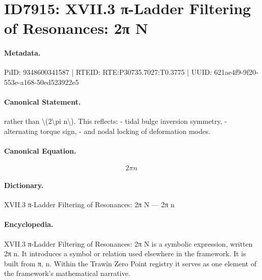 \section*{ID7915: XVII.3 π-Ladder Filtering of Resonances: 2π N}
\paragraph{Metadata.}
PiID: 9348600341587 | RTEID: RTE:P30735.7027:T0.3775 | UUID: 621ae4f9-9f20-553e-a168-50ed523922e5

\paragraph{Canonical Statement.}
rather than \textbackslash{}(2\textbackslash{}pi n\textbackslash{}). This reflects: - tidal bulge inversion symmetry, - alternating torque sign, - and nodal locking of deformation modes.

\paragraph{Canonical Equation.}
\[
2\pi n
\]

\paragraph{Dictionary.}
XVII.3 π-Ladder Filtering of Resonances: 2π N — 2π n

\paragraph{Encyclopedia.}
XVII.3 π-Ladder Filtering of Resonances: 2π N is a symbolic expression, written 2π n. It introduces a symbol or relation used elsewhere in the framework. It is built from π, n. Within the Trawin Zero Point registry it serves as one element of the framework's mathematical narrative.
